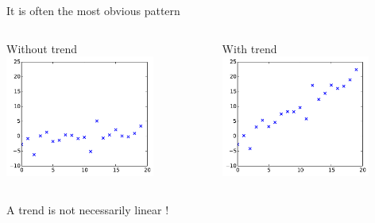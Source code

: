\documentclass{beamer}
\begin{document}
\begin{frame}{}
 It is often the most obvious pattern\\
\vspace{5mm}
\begin{columns}[c]
\column{5cm}
\begin{center}
Without trend
\includegraphics[height=4cm]{figures/2_trendno}
\end{center}
\column{5cm}
\begin{center}
With trend
\includegraphics[height=4cm]{figures/2_trend}
\end{center}
\end{columns}
\vspace{5mm}
A trend is not necessarily linear !
\end{frame}
\end{document}
